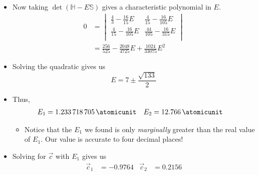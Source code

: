 \documentclass[../notes.tex]{subfiles}
\begin{document}
\begin{itemize}
\begin{itemize}
\begin{itemize}
        \end{itemize}
        \item Now taking $\det(\mathbb{H}-E\mathbb{S})$ gives a characteristic polynomial in $E$.
        \renewcommand{\arraystretch}{1.6}
        \begin{align*}
            0 &=
            \begin{vmatrix}
                \frac{4}{3}-\frac{16}{15}E & \frac{4}{15}-\frac{16}{105}E\\
                \frac{4}{15}-\frac{16}{105}E & \frac{44}{105}-\frac{16}{315}E\\
            \end{vmatrix}\\
            &= \frac{256}{525}-\frac{2048}{4725}E+\frac{1024}{33075}E^2
        \end{align*}
        \item Solving the quadratic gives us
        \begin{equation*}
            E = 7\pm\frac{\sqrt{133}}{2}
        \end{equation*}
        \item Thus,
        \begin{align*}
            E_1 &= \SI{1.233718705}{\atomicunit}&
            E_2 &= \SI{12.766}{\atomicunit}
        \end{align*}
        \begin{itemize}
            \item Notice that the $E_1$ we found is only \emph{marginally} greater than the real value of $E_1$. Our value is accurate to four decimal places!
        \end{itemize}
        \item Solving for $\vec{c}$ with $E_1$ gives us
        \begin{align*}
            \vec{c}_1 &= \num{-0.9764}&
            \vec{c}_2 &= \num{0.2156}
        \end{align*}
    \end{itemize}
\end{itemize}
\end{document}
